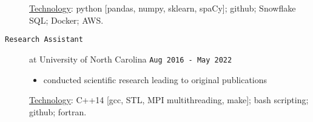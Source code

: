 \documentclass[11pt, letter]{article}
\begin{document}
\begin{minipage}{\textwidth}
\begin{description}
		\vspace{-0.5\baselineskip}
		\underline{Technology}: 
		python [pandas, numpy, sklearn, spaCy]; github; Snowflake SQL; Docker; AWS.
	\item[\tt Research Assistant] at University of North Carolina 
	\hfill {\tt Aug 2016 - May 2022}
		\vspace{-0.5\baselineskip}
		\begin{itemize}
			\item conducted scientific research leading to original publications
		\end{itemize}
		\vspace{-0.5\baselineskip}
		\underline{Technology}: 
		C++14 [gcc, STL, MPI multithreading, make]; bash scripting; github; fortran.
		\vspace{-0.5\baselineskip}
	\end{description}
\end{minipage}

\end{document}
